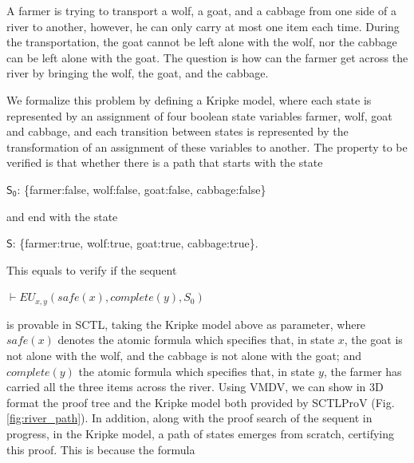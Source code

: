 \documentclass[runningheads]{llncs}
\begin{document}
\begin{example}
\label{expl:river}
A farmer is trying to transport a wolf, a goat, and a cabbage from one side of a river to another, however, he can only carry at most one item each time. During the transportation, the goat cannot be left alone with the wolf, nor the cabbage can be left alone with the goat.
The question is how can the farmer get across the river by bringing the wolf, the goat, and the cabbage.
\end{example}
 
We formalize this problem by defining a Kripke model,
where each state is represented by an assignment of four boolean state variables \textsf{farmer}, \textsf{wolf}, \textsf{goat} and \textsf{cabbage}, and
each transition between states is represented by the transformation of an assignment of these variables to another.
The property to be verified is that whether there is a path that starts with the state
\begin{center}
$\mathsf{S_0}$: \textsf{\{farmer:false, wolf:false, goat:false, cabbage:false\}}
\end{center}
and end with the state
\begin{center}
$\mathsf{S}$: \textsf{\{farmer:true, wolf:true, goat:true, cabbage:true\}}.
\end{center}
This equals to verify if the sequent \begin{center}
$\vdash EU_{x,y}(safe(x), complete(y), S_0)$
\end{center} is provable in \textsf{SCTL}, taking the Kripke model above as parameter, where $safe(x)$ denotes the atomic formula which specifies that, in state $x$, the goat is not alone with the wolf, and the cabbage is not alone with the goat; and $complete(y)$ the atomic formula which specifies that, in state $y$, the farmer has carried all the three items across the river. Using \textsf{VMDV}, we can show in 3D format the proof tree and the Kripke model both provided by \textsf{SCTLProV} (Fig. \ref{fig:river_path}).
In addition, along with the proof search of the sequent in progress,
in the Kripke model, a path of states emerges from scratch, certifying this proof.
This is because the formula
\end{document}
